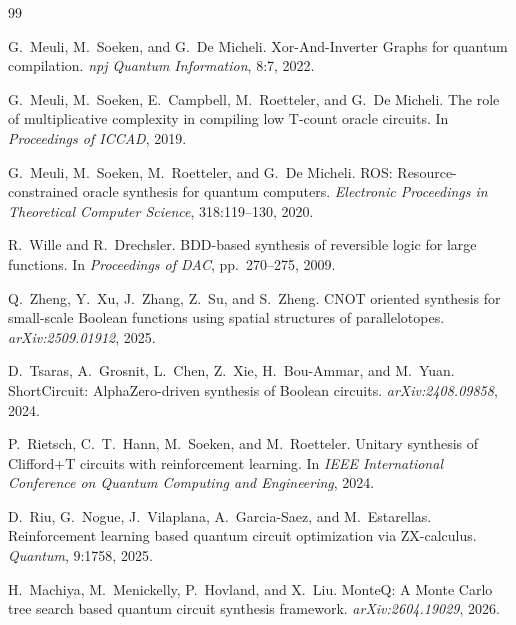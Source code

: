 \documentclass[UTF8,fontset=macnew,11pt]{ctexart}
\begin{document}
\begin{thebibliography}{99}

G.~Meuli, M.~Soeken, and G.~De Micheli.
\newblock Xor-And-Inverter Graphs for quantum compilation.
\newblock \emph{npj Quantum Information}, 8:7, 2022.

G.~Meuli, M.~Soeken, E.~Campbell, M.~Roetteler, and G.~De Micheli.
\newblock The role of multiplicative complexity in compiling low T-count oracle circuits.
\newblock In \emph{Proceedings of ICCAD}, 2019.

G.~Meuli, M.~Soeken, M.~Roetteler, and G.~De Micheli.
\newblock ROS: Resource-constrained oracle synthesis for quantum computers.
\newblock \emph{Electronic Proceedings in Theoretical Computer Science}, 318:119--130, 2020.

R.~Wille and R.~Drechsler.
\newblock BDD-based synthesis of reversible logic for large functions.
\newblock In \emph{Proceedings of DAC}, pp.~270--275, 2009.

Q.~Zheng, Y.~Xu, J.~Zhang, Z.~Su, and S.~Zheng.
\newblock CNOT oriented synthesis for small-scale Boolean functions using spatial structures of parallelotopes.
\newblock \emph{arXiv:2509.01912}, 2025.

D.~Tsaras, A.~Grosnit, L.~Chen, Z.~Xie, H.~Bou-Ammar, and M.~Yuan.
\newblock ShortCircuit: AlphaZero-driven synthesis of Boolean circuits.
\newblock \emph{arXiv:2408.09858}, 2024.

P.~Rietsch, C.~T.~Hann, M.~Soeken, and M.~Roetteler.
\newblock Unitary synthesis of Clifford+T circuits with reinforcement learning.
\newblock In \emph{IEEE International Conference on Quantum Computing and Engineering}, 2024.

D.~Riu, G.~Nogue, J.~Vilaplana, A.~Garcia-Saez, and M.~Estarellas.
\newblock Reinforcement learning based quantum circuit optimization via ZX-calculus.
\newblock \emph{Quantum}, 9:1758, 2025.

H.~Machiya, M.~Menickelly, P.~Hovland, and X.~Liu.
\newblock MonteQ: A Monte Carlo tree search based quantum circuit synthesis framework.
\newblock \emph{arXiv:2604.19029}, 2026.

\end{thebibliography}
\end{document}
